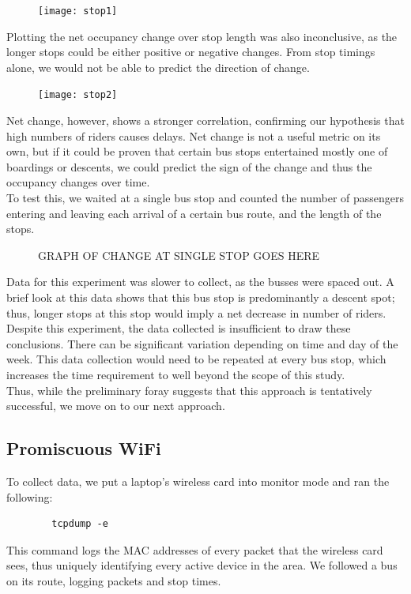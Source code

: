 \documentclass[letterpaper]{scrartcl}
\begin{document}
	\begin{figure}[H]
	\texttt{[image: stop1]}
	\centering
	\end{figure}

	Plotting the net occupancy change over stop length was also inconclusive, as the longer stops could be either positive or negative changes.
	From stop timings alone, we would not be able to predict the direction of change.

	\begin{figure}[H]
	\texttt{[image: stop2]}
	\centering
	\end{figure}

	Net change, however, shows a stronger correlation, confirming our hypothesis that high numbers of riders causes delays.
	Net change is not a useful metric on its own, but if it could be proven that certain bus stops entertained mostly one of boardings or descents, we could predict the sign of the change and thus the occupancy changes over time.
	\\
	To test this, we waited at a single bus stop and counted the number of passengers entering and leaving each arrival of a certain bus route, and the length of the stops.

	\begin{figure}[H]
	GRAPH OF CHANGE AT SINGLE STOP GOES HERE
	\centering
	\end{figure}

	Data for this experiment was slower to collect, as the busses were spaced out. A brief look at this data shows that this bus stop is predominantly a descent spot; thus, longer stops at this stop would imply a net decrease in number of riders.
	\\
	Despite this experiment, the data collected is insufficient to draw these conclusions. There can be significant variation depending on time and day of the week.
	This data collection would need to be repeated at every bus stop, which increases the time requirement to well beyond the scope of this study.
	\\
	Thus, while the preliminary foray suggests that this approach is tentatively successful, we move on to our next approach.
	
\subsection*{Promiscuous WiFi}
	To collect data, we put a laptop's wireless card into monitor mode and ran the following:
	\begin{verbatim}
		tcpdump -e
	\end{verbatim}
	This command logs the MAC addresses of every packet that the wireless card sees, thus uniquely identifying every active device in the area.
	We followed a bus on its route, logging packets and stop times.
\end{document}

